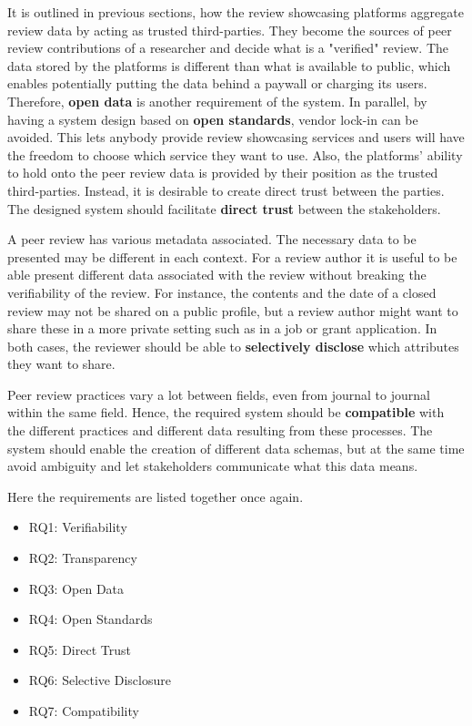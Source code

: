It is outlined in previous sections, how the review showcasing platforms aggregate review data by acting as trusted third-parties. They become the sources of peer review contributions of a researcher and decide what is a "verified" review. The data stored by the platforms is different than what is available to public, which enables potentially putting the data behind a paywall or charging its users. Therefore, \textbf{open data} is another requirement of the system. In parallel, by having a system design based on \textbf{open standards}, vendor lock-in can be avoided. This lets anybody provide review showcasing services and users will have the freedom to choose which service they want to use. Also, the platforms' ability to hold onto the peer review data is provided by their position as the trusted third-parties.  Instead, it is desirable to create direct trust between the parties. The designed system should facilitate \textbf{direct trust} between the stakeholders. 

A peer review has various metadata associated. The necessary data to be presented may be different in each context. For a review author it is useful to be able present different data associated with the review without breaking the verifiability of the review. For instance, the contents and the date of a closed review may not be shared on a public profile, but a review author might want to share these in a more private setting such as in a job or grant application. In both cases, the reviewer should be able to \textbf{selectively disclose} which attributes they want to share.

Peer review practices vary a lot between fields, even from journal to journal within the same field. Hence, the required system should be \textbf{compatible} with the different practices and different data resulting from these processes. The system should enable the creation of different data schemas, but at the same time avoid ambiguity and let stakeholders communicate what this data means.

Here the requirements are listed together once again.
\begin{itemize}
  \item RQ1: Verifiability \label{rq:verifiable}
  \item RQ2: Transparency \label{rq:transparent}
  \item RQ3: Open Data \label{rq:open-data}
  \item RQ4: Open Standards \label{rq:open-standards}
  \item RQ5: Direct Trust \label{rq:direct-trust}
  \item RQ6: Selective Disclosure \label{rq:selective-disclosure}
  \item RQ7: Compatibility \label{rq:compatible}
\end{itemize}

